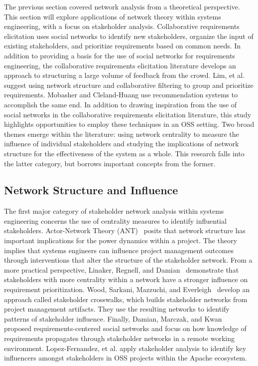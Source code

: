 The previous section covered network analysis from a theoretical perspective. This section will explore applications of network theory within systems engineering, with a focus on stakeholder analysis. Collaborative requirements elicitation \cite{stakerare, stakenet, stakesource, mobasher} uses social networks to identify new stakeholders, organize the input of existing stakeholders, and prioritize requirements based on common needs. In addition to providing a basis for the use of social networks for requirements engineering, the collaborative requirements elicitation literature develops an approach to structuring a large volume of feedback from the crowd. Lim, et al. \cite{stakerare, stakenet, stakesource, lim} suggest using network structure and collaborative filtering to group and prioritize requirements. Mobasher and Cleland-Huang \cite{mobasher} use recommendation systems to accomplish the same end. In addition to drawing inspiration from the use of social networks in the collaborative requirements elicitation literature, this study highlights opportunities to employ these techniques in an OSS setting. Two broad themes emerge within the literature: using network centrality to measure the influence of individual stakeholders and studying the implications of network structure for the effectiveness of the system as a whole. This research falls into the latter category, but borrows important concepts from the former.

\subsection{Network Structure and Influence}

The first major category of stakeholder network analysis within systems engineering concerns the use of centrality measures to identify influential stakeholders. Actor-Network Theory (ANT)~\cite{missonier} posits that network structure has important implications for the power dynamics within a project. The theory implies that systems engineers can influence project management outcomes through interventions that alter the structure of the stakeholder network. From a more practical perspective, Linaker, Regnell, and Damian~\cite{regnell} demonstrate that stakeholders with more centrality within a network have a stronger influence on requirement prioritization. Wood, Sarkani, Mazzuchi, and Everleigh~\cite{wood} develop an approach called stakeholder crosswalks, which builds stakeholder networks from project management artifacts. They use the resulting networks to identify patterns of stakeholder influence. Finally, Damian, Marczak, and Kwan~\cite{damian} proposed requirements-centered social networks and focus on how knowledge of requirements propagates through stakeholder networks in a remote working environment. Lopez-Fernandez, et al. \cite{lopez} apply stakeholder analysis to identify key influencers amongst stakeholders in OSS projects within the Apache ecosystem.

